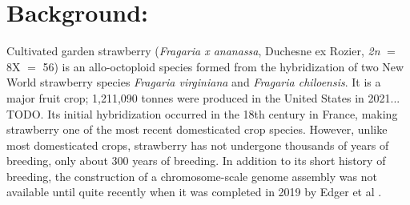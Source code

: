 \documentclass[fleqn,10pt]{olplainarticle}
\begin{document}
\flushbottom
\maketitle
\thispagestyle{empty}

\newpage




% 

\section{Background:}
Cultivated garden strawberry (\textit{Fragaria x ananassa}, Duchesne ex Rozier, \textit{2n} $=$ 8X $=$ 56) is an allo-octoploid species formed from the hybridization of two New World strawberry species \textit{Fragaria virginiana} and \textit{Fragaria chiloensis}.
It is a major fruit crop; 1,211,090 tonnes were produced in the United States in 2021... TODO.
Its initial hybridization occurred in the 18th century in France, making strawberry one of the most recent domesticated crop species.
However, unlike most domesticated crops, strawberry has not undergone thousands of years of breeding, only about 300 years of breeding.
In addition to its short history of breeding, the construction of a chromosome-scale genome assembly was not available until quite recently when it was completed in 2019 by Edger et al \cite{Edger2019}. \\
\end{document}

